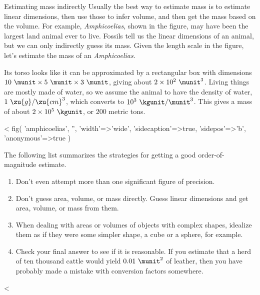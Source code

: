 \begin{eg}{Estimating mass indirectly}\label{eg:amphicoelias}
Usually the best way to estimate mass is to estimate linear dimensions,
then use those to infer volume, and then get the mass based on the volume.
For example, \emph{Amphicoelias}, shown in the figure, may have been the largest
land animal ever to live. Fossils tell us the linear dimensions of an animal,
but we can only indirectly guess its mass. Given the length scale in the figure,
let's estimate the mass of an \emph{Amphicoelias}.

Its torso looks like it can be approximated by a rectangular box with dimensions
$10\ \munit\times5\ \munit\times3\ \munit$, giving about $2\times10^2\ \munit^3$. Living things
are mostly made of water, so we assume the animal to have the density of water,
$1\ \zu{g}/\zu{cm}^3$, which converts to $10^3\ \kgunit/\munit^3$. This
gives a mass of about $2\times10^5\ \kgunit$, or 200 metric tons.
\end{eg}


<%
  fig(
    'amphicoelias',
    '',
    {
      'width'=>'wide',
      'sidecaption'=>true,
      'sidepos'=>'b',
      'anonymous'=>true
    }
  )



The following list summarizes the strategies for getting a
good order-of-magnitude estimate.

\begin{enumerate}
\item Don't even attempt more than one significant figure of precision.

\item Don't guess area, volume, or mass directly. Guess linear
dimensions and get area, volume, or mass from them.

\item When dealing with areas or volumes of objects with
complex shapes, idealize them as if they were some simpler
shape, a cube or a sphere, for example.

\item Check your final answer to see if it is reasonable. If
you estimate that a herd of ten thousand cattle would yield
$0.01\ \munit^2$ of leather, then you have probably made a mistake
with conversion factors somewhere.
\end{enumerate}

<%

